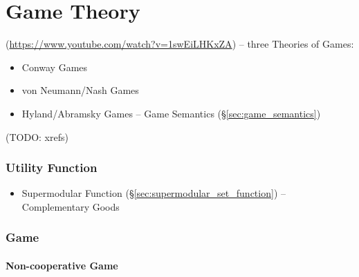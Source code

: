 \part{Game Theory}\label{sec:game_theory}

(\url{https://www.youtube.com/watch?v=1swEiLHKxZA}) -- three Theories of Games:
\begin{itemize}
  \item Conway Games
  \item von Neumann/Nash Games
  \item Hyland/Abramsky Games -- Game Semantics (\S\ref{sec:game_semantics})
\end{itemize}
(TODO: xrefs)



\section{Utility Function}\label{sec:utility_function}

\begin{itemize}
  \item Supermodular Function (\S\ref{sec:supermodular_set_function}) --
    Complementary Goods
\end{itemize}



\section{Game}\label{sec:game}

\subsection{Non-cooperative Game}\label{sec:noncooperative_game}


